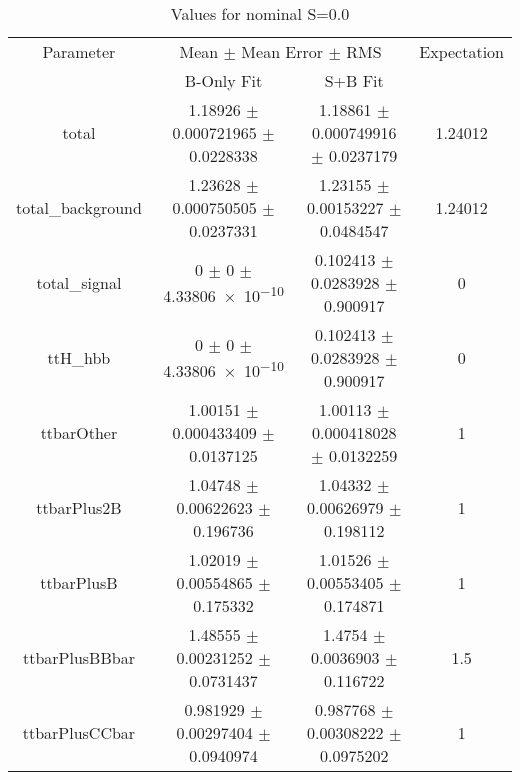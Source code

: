 \begin{table}
\centering
\caption{Values for nominal S=0.0}
\begin{tabular}{cccc}
\toprule
Parameter & \multicolumn{2}{c}{Mean $\pm$ Mean Error $\pm$ RMS} & Expectation\\
 & B-Only Fit & S+B Fit & \\
\midrule
total & \num{1.18926} $\pm$ \num{0.000721965} $\pm$ \num{0.0228338} & \num{1.18861} $\pm$ \num{0.000749916} $\pm$ \num{0.0237179} & \num{1.24012}\\
total\_background & \num{1.23628} $\pm$ \num{0.000750505} $\pm$ \num{0.0237331} & \num{1.23155} $\pm$ \num{0.00153227} $\pm$ \num{0.0484547} & \num{1.24012}\\
total\_signal & \num{0} $\pm$ \num{0} $\pm$ \num{4.33806e-10} & \num{0.102413} $\pm$ \num{0.0283928} $\pm$ \num{0.900917} & \num{0}\\
ttH\_hbb & \num{0} $\pm$ \num{0} $\pm$ \num{4.33806e-10} & \num{0.102413} $\pm$ \num{0.0283928} $\pm$ \num{0.900917} & \num{0}\\
ttbarOther & \num{1.00151} $\pm$ \num{0.000433409} $\pm$ \num{0.0137125} & \num{1.00113} $\pm$ \num{0.000418028} $\pm$ \num{0.0132259} & \num{1}\\
ttbarPlus2B & \num{1.04748} $\pm$ \num{0.00622623} $\pm$ \num{0.196736} & \num{1.04332} $\pm$ \num{0.00626979} $\pm$ \num{0.198112} & \num{1}\\
ttbarPlusB & \num{1.02019} $\pm$ \num{0.00554865} $\pm$ \num{0.175332} & \num{1.01526} $\pm$ \num{0.00553405} $\pm$ \num{0.174871} & \num{1}\\
ttbarPlusBBbar & \num{1.48555} $\pm$ \num{0.00231252} $\pm$ \num{0.0731437} & \num{1.4754} $\pm$ \num{0.0036903} $\pm$ \num{0.116722} & \num{1.5}\\
ttbarPlusCCbar & \num{0.981929} $\pm$ \num{0.00297404} $\pm$ \num{0.0940974} & \num{0.987768} $\pm$ \num{0.00308222} $\pm$ \num{0.0975202} & \num{1}\\
\bottomrule
\end{tabular}
\end{table}